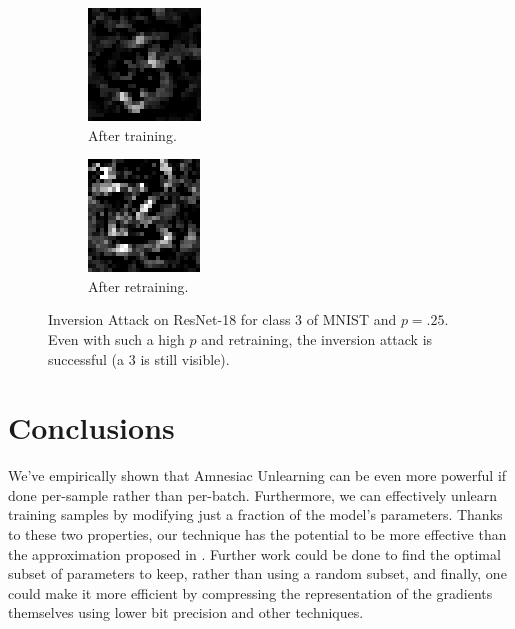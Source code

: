 \documentclass{article}
\begin{document}
\begin{figure}
    \centering
    \begin{subfigure}[b]{0.23\textwidth}
        \centering
        \includegraphics[width=.48\textwidth]{trained_single.png}
        \caption{After training.}
    \end{subfigure}%
    \begin{subfigure}[b]{0.23\textwidth}
        \centering
        \includegraphics[width=.48\textwidth]{retrained_single.png}
        \caption{After retraining.}
    \end{subfigure}
    \caption{Inversion Attack on ResNet-18 for class $3$ of MNIST and $p=.25$. Even with such a high $p$ and retraining, the inversion attack is successful (a $3$ is still visible).}
    \label{fig:inversion}
\end{figure}

\section{Conclusions}
We've empirically shown that Amnesiac Unlearning can be even more powerful if done per-sample rather than per-batch. Furthermore, we can effectively unlearn training samples by modifying just a fraction of the model's parameters. Thanks to these two properties, our technique has the potential to be more effective than the approximation proposed in \cite{gogineni2024efficient}. Further work could be done to find the optimal subset of parameters to keep, rather than using a random subset, and finally, one could make it more efficient by compressing the representation of the gradients themselves using lower bit precision and other techniques.



\end{document}
